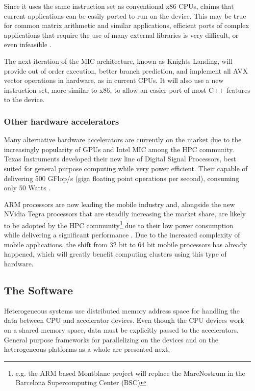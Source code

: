 Since it uses the same instruction set as conventional x86 CPUs, \intel claims that current applications can be easily ported to run on the device. This may be true for common matrix arithmetic and similar applications, efficient ports of complex applications that require the use of many external libraries is very difficult, or even infeasible \cite{Msc:AMP}.

The next iteration of the MIC architecture, known as Knights Landing, will provide out of order execution, better branch prediction, and implement all AVX vector operations in hardware, as in current \intel CPUs. It will also use a new instruction set, more similar to x86, to allow an easier port of most C++ features to the device.

\subsubsection*{Other hardware accelerators}
\label{other_accelerators}

Many alternative hardware accelerators are currently on the market due to the increasingly popularity of GPUs and Intel MIC among the HPC community. Texas Instruments developed their new line of Digital Signal Processors, best suited for general purpose computing while very power efficient. Their capable of delivering 500 GFlop/s (giga floating point operations per second), consuming only 50 Watts \cite{Texas:DSP}.

ARM processors are now leading the mobile industry and, alongside the new NVidia Tegra processors \cite{NVIDIA:Tegra} that are steadily increasing the market share, are likely to be adopted by the HPC community\footnote{e.g. the ARM based Montblanc project will replace the MareNostrum in the Barcelona Supercomputing Center (BSC)} due to their low power consumption while delivering a significant performance \cite{ARM}. Due to the increased complexity of mobile applications, the shift from 32 bit to 64 bit mobile processors has already happened, which will greatly benefit computing clusters using this type of hardware.

\subsection{The Software}
\label{distributed_mem}

Heterogeneous systems use distributed memory address space for handling the data between CPU and accelerator devices. Even though the CPU devices work on a shared memory space, data must be explicitly passed to the accelerators. General purpose frameworks for parallelizing on the devices and on the heterogeneous platforms as a whole are presented next.

